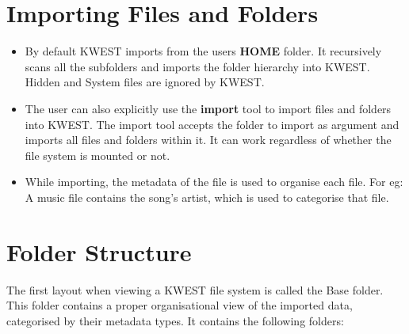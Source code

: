 \section{Importing Files and Folders}

\begin{itemize}
\item By default KWEST imports from the users \textbf{HOME} folder. It recursively scans all the subfolders and imports the folder hierarchy into KWEST. Hidden and System files are ignored by KWEST.

\item The user can also explicitly use the \textbf{import} tool to import files and folders into KWEST. The import tool accepts the folder to import as argument and imports all files and folders within it. It can work regardless of whether the file system is mounted or not.

\item While importing, the metadata of the file is used to organise each file. For eg: A music file contains the song's artist, which is used to categorise that file.
\end{itemize}

\section{Folder Structure}

The first layout when viewing a KWEST file system is called the Base folder. This folder contains a proper organisational view of the imported data, categorised by their metadata types. It contains the following folders:

